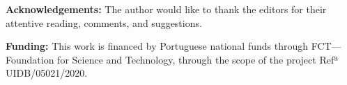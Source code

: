 \documentclass{tufte-handout}
\begin{document}
\vspace*{1.5em}

\textbf{Acknowledgements:} The author would like to thank the editors
for their attentive reading, comments, and suggestions.

\vspace*{0.75em}

\noindent\textbf{Funding:} This work is financed by Portuguese national funds
through FCT---Foundation for Science and Technology, through the scope
of the project Refª UIDB/05021/2020.
\end{document}
